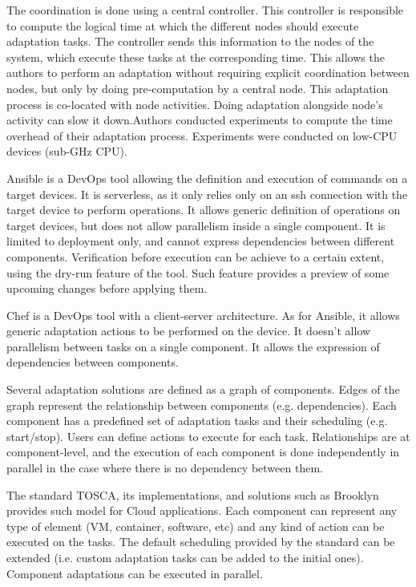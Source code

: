 \documentclass{article}
\begin{document}
The coordination is done using a central controller. This controller is responsible to compute the logical time at which the different nodes should execute adaptation tasks. The controller sends this information to the nodes of the system, which execute these tasks at the corresponding time. This allows the authors to perform an adaptation without requiring explicit coordination between nodes, but only by doing pre-computation by a central node. This adaptation process is co-located with node activities. Doing adaptation alongside node's activity can slow it down.Authors conducted experiments to compute the time overhead of their adaptation process. Experiments were conducted on low-CPU devices (\ie sub-GHz CPU). 

Ansible is a DevOps tool allowing the definition and execution of commands on a target devices. It is serverless, as it only relies only on an ssh connection with the target device to perform operations. It allows generic definition of operations on target devices, but does not allow parallelism inside a single component. It is limited to deployment only, and cannot express dependencies between different components. Verification before execution can be achieve to a certain extent, using the dry-run feature of the tool. Such feature provides a preview of some upcoming changes before applying them. 

Chef is a DevOps tool with a client-server architecture. As for Ansible, it allows generic adaptation actions to be performed on the device. It doesn't allow parallelism between tasks on a single component. It allows the expression of dependencies between components.

Several adaptation solutions are defined as a graph of components. Edges of the graph represent the relationship between components (e.g. dependencies). Each component has a predefined set of adaptation tasks and their scheduling (e.g. start/stop). Users can define actions to execute for each task. Relationships are at component-level, and the execution of each component is done independently in parallel in the case where there is no dependency between them. 

The standard TOSCA, its implementations, and solutions such as Brooklyn provides such model for Cloud applications. Each component can represent any type of element (VM, container, software, etc) and any kind of action can be executed on the tasks. The default scheduling provided by the standard can be extended (i.e. custom adaptation tasks can be added to the initial ones). Component adaptations can be executed in parallel.
\end{document}
